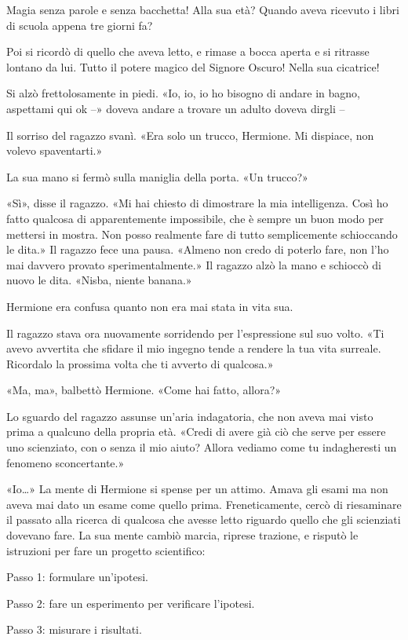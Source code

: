 Magia senza parole e senza bacchetta! Alla sua età? Quando aveva ricevuto i libri di scuola appena tre giorni fa?

Poi si ricordò di quello che aveva letto, e rimase a bocca aperta e si ritrasse lontano da lui. Tutto il potere magico del Signore Oscuro! Nella sua cicatrice!

Si alzò frettolosamente in piedi. «Io, io, io ho bisogno di andare in bagno, aspettami qui ok –» doveva andare a trovare un adulto doveva dirgli –

Il sorriso del ragazzo svanì. «Era solo un trucco, Hermione. Mi dispiace, non volevo spaventarti.»

La sua mano si fermò sulla maniglia della porta. «Un trucco?»

«Sì», disse il ragazzo. «Mi hai chiesto di dimostrare la mia intelligenza. Così ho fatto qualcosa di apparentemente impossibile, che è sempre un buon modo per mettersi in mostra. Non posso realmente fare di tutto semplicemente schioccando le dita.» Il ragazzo fece una pausa. «Almeno non credo di poterlo fare, non l’ho mai davvero provato sperimentalmente.» Il ragazzo alzò la mano e schioccò di nuovo le dita. «Nisba, niente banana.»

Hermione era confusa quanto non era mai stata in vita sua.

Il ragazzo stava ora nuovamente sorridendo per l’espressione sul suo volto. «Ti avevo avvertita che sfidare il mio ingegno tende a rendere la tua vita surreale. Ricordalo la prossima volta che ti avverto di qualcosa.»

«Ma, ma», balbettò Hermione. «Come hai fatto, allora?»

Lo sguardo del ragazzo assunse un’aria indagatoria, che non aveva mai visto prima a qualcuno della propria età. «Credi di avere già ciò che serve per essere uno scienziato, con o senza il mio aiuto? Allora vediamo come tu indagheresti un fenomeno sconcertante.»

«Io…» La mente di Hermione si spense per un attimo. Amava gli esami ma non aveva mai dato un esame come quello prima. Freneticamente, cercò di riesaminare il passato alla ricerca di qualcosa che avesse letto riguardo quello che gli scienziati dovevano fare. La sua mente cambiò marcia, riprese trazione, e risputò le istruzioni per fare un progetto scientifico:

Passo 1: formulare un’ipotesi.

Passo 2: fare un esperimento per verificare l’ipotesi.

Passo 3: misurare i risultati.

